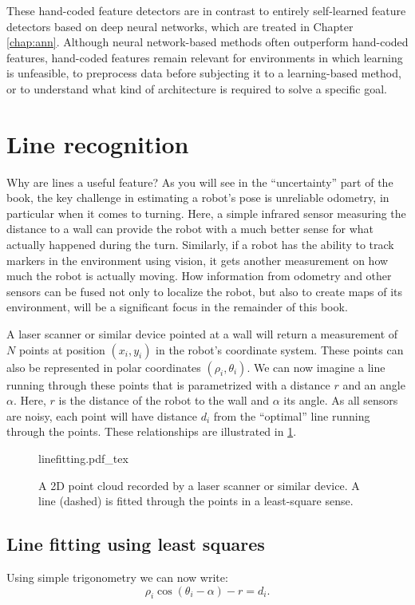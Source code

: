 These hand-coded feature detectors are in contrast to entirely self-learned feature detectors based on deep neural networks, which are treated in Chapter \cref{chap:ann}. Although neural network-based methods often outperform hand-coded features, hand-coded features remain relevant for environments in which learning is unfeasible, to preprocess data before subjecting it to a learning-based method, or to understand what kind of architecture is required to solve a specific goal. 

\section{Line recognition}
\label{sec:line_recognition}
Why are lines a useful feature? As you will see in the ``uncertainty'' part of the book, the key challenge in estimating a robot's pose is unreliable odometry, in particular when it comes to turning. Here, a simple infrared sensor measuring the distance to a wall can provide the robot with a much better sense for what actually happened during the turn. Similarly, if a robot has the ability to track markers in the environment using vision, it gets another measurement on how much the robot is actually moving. How information from odometry and other sensors can be fused not only to localize the robot, but also to create maps of its environment, will be a significant focus in the remainder of this book.

A laser scanner or similar device pointed at a wall will return a measurement of $N$ points at position $(x_i,y_i)$ in the robot's coordinate system. These points can also be represented in polar coordinates $ (\rho_i,\theta_i)$. We can now imagine a line running through these points that is parametrized with a distance $r$ and an angle $\alpha$. Here, $r$ is the distance of the robot to the wall and $ \alpha$ its angle. As all sensors are noisy, each point will have distance $d_i$ from the ``optimal'' line running through the points. These relationships are illustrated in \cref{fig:linefitting}.

\begin{figure}
	\centering
    \def\svgwidth{\textwidth}
    {linefitting.pdf_tex}
	\caption{A 2D point cloud recorded by a laser scanner or similar device. A line (dashed) is fitted through the points in a least-square sense.}
	\label{fig:linefitting}
\end{figure}

\subsection{Line fitting using least squares}
Using simple trigonometry we can now write:
\begin{equation}
\rho_i \cos(\theta_i-\alpha)-r=d_i.
\end{equation}

